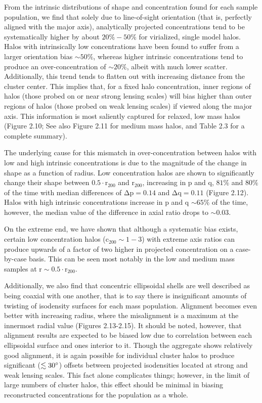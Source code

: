 From the intrinsic distributions of shape and concentration found for
each sample population, we find that solely due to line-of-sight
orientation (that is, perfectly aligned with the major axis),
analytically projected concentrations tend to be 
systematically higher by about $20\%-50\%$ for virialized, single model halos. Halos with
intrinsically low concentrations have been found to suffer from a larger
orientation bias $\sim 50\%$, whereas higher intrinsic concentrations
tend to produce an over-concentration of $\sim 20\%$, albeit with much lower
scatter. Additionally, this trend tends to flatten out with
increasing distance from the cluster center. This implies that, for a fixed 
halo concentration, inner regions of halos (those probed on or near strong
lensing scales) will bias higher than outer regions of halos (those probed
on weak lensing scales) if viewed along the major axis. This information is
most saliently captured for relaxed, low mass halos (Figure 2.10; See also
Figure 2.11 for medium mass halos, and Table 2.3 for a complete summary). 

The underlying cause for this mismatch in over-concentration between
halos with low and high intrinsic concentrations is due to the magnitude of the
change in shape as a function of radius. Low concentration halos are shown to
significantly change their shape between $\mathrm{0.5 \cdot r_{200}}$ and $\mathrm{r_{200}}$,
increasing in p and q, $81\%$ and $80\%$ of the time with median differences of
$\mathrm{\Delta p = 0.14}$ and $\mathrm{\Delta q = 0.11}$ (Figure 2.12). Halos with high intrinsic 
concentrations increase in p and q $\sim 65 \%$ of the time, however,
the median value of the difference in axial ratio drops to $\sim 0.03$.

On the extreme end, we have shown that although a systematic bias
exists, certain low concentration halos ($\mathrm{c_{200}\sim 1-3}$) with extreme
axis ratios can produce upwards of a factor of two higher in projected
concentration on a case-by-case basis. This can be seen most notably
in the low and medium mass samples at $\mathrm{r\sim 0.5 \cdot  r_{200}}$.

Additionally, we also find that concentric ellipsoidal shells are well
described as being coaxial with one another, that is to say there
is insignificant amounts of twisting of isodensity surfaces for each mass
population. Alignment becomes even better with increasing radius,
where the misalignment is a maximum at the innermost radial
value (Figures 2.13-2.15). It should be noted, however, that alignment results
are expected to be biased low due to correlation between each ellipsoidal
surface and ones interior to it. Though the aggregate shows relatively
good alignment, it is again possible for individual cluster halos to produce
significant ($\lesssim 30^{\circ}$) offsets between projected isodensities
located at strong and weak lensing scales. This fact alone complicates
things; however, in the limit of large numbers of cluster halos, this
effect should be minimal in biasing reconstructed concentrations for
the population as a whole.  

